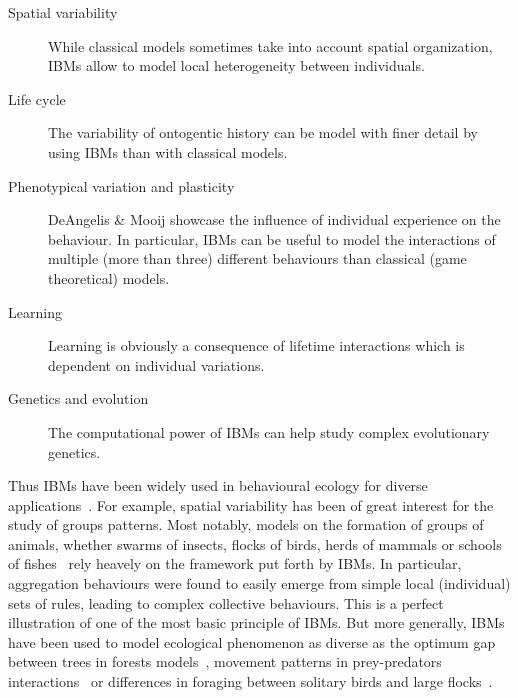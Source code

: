     \begin{description}
        \item[Spatial variability] {While classical models sometimes take into account spatial organization, IBMs allow to model local heterogeneity between individuals.}
        \item[Life cycle] {The variability of ontogentic history can be model with finer detail by using IBMs than with classical models.}
        \item[Phenotypical variation and plasticity] {DeAngelis \& Mooij showcase the influence of individual experience on the behaviour. In particular, IBMs can be useful to model the interactions of multiple (more than three) different behaviours than classical (game theoretical) models.}
        \item[Learning] {Learning is obviously a consequence of lifetime interactions which is dependent on individual variations.}
        \item[Genetics and evolution] {The computational power of IBMs can help study complex evolutionary genetics.}
    \end{description}

    Thus IBMs have been widely used in behavioural ecology for diverse applications~\parencite{DeAngelis2005}. For example, spatial variability has been of great interest for the study of groups patterns. Most notably, models on the formation of groups of animals, whether swarms of insects, flocks of birds, herds of mammals or schools of fishes~\parencite{Huth1992, Gueron1996, Couzin2002} rely heavely on the framework put forth by IBMs. In particular, aggregation behaviours were found to easily emerge from simple local (individual) sets of rules, leading to complex collective behaviours. This is a perfect illustration of one of the most basic principle of IBMs. But more generally, IBMs have been used to model ecological phenomenon as diverse as the optimum gap between trees in forests models~\parencite{Botkin1972}, movement patterns in prey-predators interactions~\parencite{Smith1991} or differences in foraging between solitary birds and large flocks~\parencite{Toquenaga1995}.

